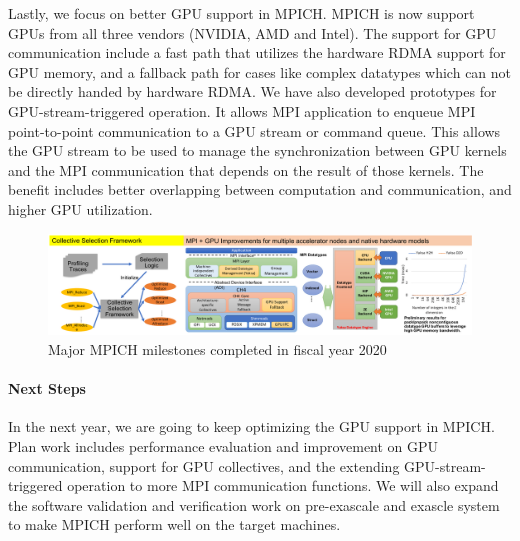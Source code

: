 Lastly, we focus on better GPU support in MPICH. MPICH is now support
GPUs from all three vendors (NVIDIA, AMD and Intel). The support for
GPU communication include a fast path that utilizes the hardware RDMA
support for GPU memory, and a fallback path for cases like complex
datatypes which can not be directly handed by hardware RDMA. We have
also developed prototypes for GPU-stream-triggered operation. It allows
MPI application to enqueue MPI point-to-point communication to a GPU
stream or command queue. This allows the GPU stream to be used to manage
the synchronization between GPU kernels and the MPI communication that
depends on the result of those kernels. The benefit includes better
overlapping between computation and communication, and higher GPU
utilization.

\begin{figure}[htb]
  \centering
  \includegraphics[width=6in]{projects/2.3.1-PMR/2.3.1.07-Exascale-MPI/MPICH-recent-milestones.pdf}
  \caption{\label{fig:fy20}Major MPICH milestones completed in fiscal year 2020}
\end{figure}

\paragraph{Next Steps}
In the next year, we are going to keep optimizing the GPU support in
MPICH. Plan work includes performance evaluation and improvement on GPU
communication, support for GPU collectives, and the extending
GPU-stream-triggered operation to more MPI communication functions.
We will also expand the software validation and verification work on
pre-exascale and exascle system to make MPICH perform well on the target
machines.
